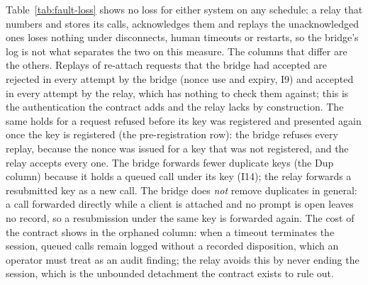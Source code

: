 Table~\ref{tab:fault-loss} shows no loss for either system on any
schedule: a relay that numbers and stores its calls, acknowledges them and
replays the unacknowledged ones loses nothing under disconnects, human
timeouts or restarts, so the bridge's log is not what separates the two
on this measure. The columns that differ are the others. Replays of
re-attach requests that the bridge had accepted are rejected in every
attempt by the bridge (nonce use and expiry, I9) and accepted in every
attempt by the relay, which has nothing to check them against; this is the
authentication the contract adds and the relay lacks by construction. The
same holds for a request refused before its key was registered and
presented again once the key is registered (the pre-registration row): the
bridge refuses every replay, because the nonce was issued for a key that was
not registered, and the relay accepts every one. The bridge forwards fewer duplicate
keys (the Dup column) because it holds a queued call under its key (I14);
the relay forwards a resubmitted key as a new call. The bridge does
\emph{not} remove duplicates in general: a call forwarded directly while a
client is attached and no prompt is open leaves no record, so a
resubmission under the same key is forwarded again. The cost of the
contract shows in the orphaned column: when a timeout terminates the
session, queued calls remain logged without a recorded disposition, which
an operator must treat as an audit finding; the relay avoids this by never
ending the session, which is the unbounded detachment the contract exists
to rule out.

